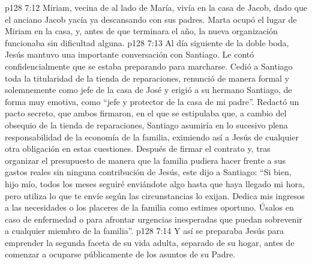 \vs p128 7:12 Miriam, vecina de al lado de María, vivía en la casa de Jacob, dado que el anciano Jacob yacía ya descansando con sus padres. Marta ocupó el lugar de Miriam en la casa, y, antes de que terminara el año, la nueva organización funcionaba sin dificultad alguna.
\vs p128 7:13 \pc Al día siguiente de la doble boda, Jesús mantuvo una importante conversación con Santiago. Le contó confidencialmente que se estaba preparando para marcharse. Cedió a Santiago toda la titularidad de la tienda de reparaciones, renunció de manera formal y solemnemente como jefe de la casa de José y erigió a su hermano Santiago, de forma muy emotiva, como “jefe y protector de la casa de mi padre”. Redactó un pacto secreto, que ambos firmaron, en el que se estipulaba que, a cambio del obsequio de la tienda de reparaciones, Santiago asumiría en lo sucesivo plena responsabilidad de la economía de la familia, eximiendo así a Jesús de cualquier otra obligación en estas cuestiones. Después de firmar el contrato y, tras organizar el presupuesto de manera que la familia pudiera hacer frente a sus gastos reales sin ninguna contribución de Jesús, este dijo a Santiago: “Si bien, hijo mío, todos los meses seguiré enviándote algo hasta que haya llegado mi hora, pero utiliza lo que te envíe según las circunstancias lo exijan. Dedica mis ingresos a las necesidades o los placeres de la familia como estimes oportuno. Úsalos en caso de enfermedad o para afrontar urgencias inesperadas que puedan sobrevenir a cualquier miembro de la familia”.
\vs p128 7:14 Y así se preparaba Jesús para emprender la segunda faceta de su vida adulta, separado de su hogar, antes de comenzar a ocuparse públicamente de los asuntos de su Padre.
